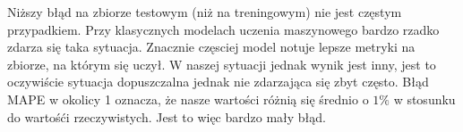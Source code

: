 \documentclass[12pt]{mwart}
\begin{document}
Niższy błąd na zbiorze testowym (niż na treningowym) nie jest częstym przypadkiem. Przy klasycznych modelach uczenia maszynowego bardzo rzadko zdarza się taka sytuacja. Znacznie częsciej model notuje lepsze metryki na zbiorze, na którym się uczył. W naszej sytuacji jednak wynik jest inny, jest to oczywiście sytuacja dopuszczalna jednak nie zdarzająca się zbyt często. Błąd MAPE w okolicy 1 oznacza, że nasze wartości różnią się średnio o $1\%$ w stosunku do wartośći rzeczywistych. Jest to więc bardzo mały błąd.








	
\end{document}
